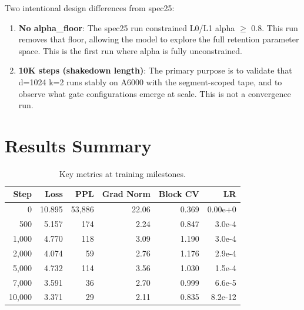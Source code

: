 \documentclass[11pt,a4paper]{article}
\begin{document}
\noindent Two intentional design differences from spec25:
\begin{enumerate}
    \item \textbf{No alpha\_floor}: The spec25 run constrained L0/L1 alpha $\geq$ 0.8. This run removes that floor, allowing the model to explore the full retention parameter space. This is the first run where alpha is fully unconstrained.
    \item \textbf{10K steps (shakedown length)}: The primary purpose is to validate that d=1024 k=2 runs stably on A6000 with the segment-scoped tape, and to observe what gate configurations emerge at scale. This is not a convergence run.
\end{enumerate}

\section{Results Summary}

\begin{table}[H]
\centering
\caption{Key metrics at training milestones.}
\begin{tabular}{rrrrrr}
\toprule
\textbf{Step} & \textbf{Loss} & \textbf{PPL} & \textbf{Grad Norm} & \textbf{Block CV} & \textbf{LR} \\
\midrule
0      & 10.895 & 53,886 & 22.06 & 0.369 & 0.00e+0 \\
500    &  5.157 &    174 &  2.24 & 0.847 & 3.0e-4 \\
1,000  &  4.770 &    118 &  3.09 & 1.190 & 3.0e-4 \\
2,000  &  4.074 &     59 &  2.76 & 1.176 & 2.9e-4 \\
5,000  &  4.732 &    114 &  3.56 & 1.030 & 1.5e-4 \\
7,000  &  3.591 &     36 &  2.70 & 0.999 & 6.6e-5 \\
10,000 &  3.371 &     29 &  2.11 & 0.835 & 8.2e-12 \\
\bottomrule
\end{tabular}
\end{table}
\end{document}
